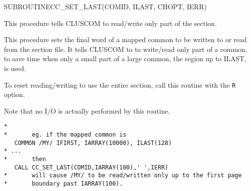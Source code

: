 \begin{routine} %
\subroutine
   {SUBROUTINE}{CC\_SET\_LAST}{(COMID, ILAST, CHOPT, IERR)}
\begin{overview}
This procedure tells CLUSCOM to read/write only part of the section.

\end{overview}
\begin{argdeflist}
\end{argdeflist}
\begin{describe}
This procedure sets the final word of a mapped common to 
be written to or read from the section file. It tells CLUSCOM to
to write/read only part of a common, to save time when only a small part
of a large common, the region up to ILAST, is used.

To reset reading/writing to use the entire section, call this routine with
the {\tt R} option.

Note that no I/O is actually performed by this routine.
\end{describe}
\begin{options}
\end{options}
\begin{returncodes}
\end{returncodes}
\begin{examplecode}\begin{verbatim}
*
*       eg. if the mapped common is
   COMMON /MY/ IFIRST, IARRAY(10000), ILAST(128)
* ...
*       then
   CALL CC_SET_LAST(COMID,IARRAY(100),' ',IERR)
*       will cause /MY/ to be read/written only up to the first page
*       boundary past IARRAY(100).
\end{verbatim}\end{examplecode}
\end{routine}


